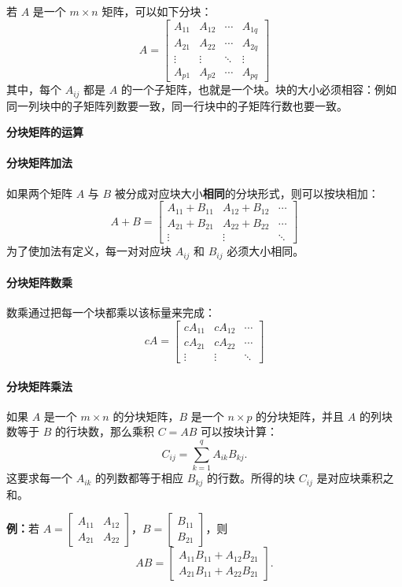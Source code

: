 若 $A$ 是一个 $m\times n$ 矩阵，可以如下分块：
\[
A = \begin{bmatrix}
    A_{11} & A_{12} & \cdots & A_{1q} \\
    A_{21} & A_{22} & \cdots & A_{2q} \\
    \vdots & \vdots & \ddots & \vdots \\
    A_{p1} & A_{p2} & \cdots & A_{pq}
\end{bmatrix}
\]
其中，每个 $A_{ij}$ 都是 $A$ 的一个子矩阵，也就是一个块。块的大小必须相容：例如同一列块中的子矩阵列数要一致，同一行块中的子矩阵行数也要一致。

\textbf{分块矩阵的运算}

\paragraph*{分块矩阵加法}
如果两个矩阵 $A$ 与 $B$ 被分成对应块大小\textbf{相同}的分块形式，则可以按块相加：
\[
A+B=\begin{bmatrix}
A_{11}+B_{11} & A_{12}+B_{12} & \cdots\\
A_{21}+B_{21} & A_{22}+B_{22} & \cdots\\
\vdots & \vdots & \ddots
\end{bmatrix}
\]
为了使加法有定义，每一对对应块 $A_{ij}$ 和 $B_{ij}$ 必须大小相同。

\paragraph*{分块矩阵数乘}
数乘通过把每一个块都乘以该标量来完成：
\[
cA=\begin{bmatrix}
cA_{11} & cA_{12} & \cdots\\
cA_{21} & cA_{22} & \cdots\\
\vdots & \vdots & \ddots
\end{bmatrix}
\]

\paragraph*{分块矩阵乘法}
如果 $A$ 是一个 $m\times n$ 的分块矩阵，$B$ 是一个 $n\times p$ 的分块矩阵，并且 $A$ 的列块数等于 $B$ 的行块数，那么乘积 $C=AB$ 可以按块计算：
\[
C_{ij}=\sum_{k=1}^{q}A_{ik}B_{kj}.
\]
这要求每一个 $A_{ik}$ 的列数都等于相应 $B_{kj}$ 的行数。所得的块 $C_{ij}$ 是对应块乘积之和。

\textbf{例：}若 $A=\begin{bmatrix}A_{11}&A_{12}\\A_{21}&A_{22}\end{bmatrix}$，$B=\begin{bmatrix}B_{11}\\B_{21}\end{bmatrix}$，则
\[
AB=\begin{bmatrix}
A_{11}B_{11}+A_{12}B_{21}\\
A_{21}B_{11}+A_{22}B_{21}
\end{bmatrix}.
\]

